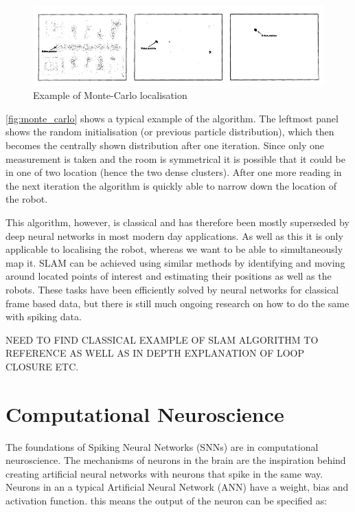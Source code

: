 \begin{figure}[htb]
      \centering
      \includegraphics[width=\textwidth]{background/images/monte_carlo.png}
      \caption{Example of Monte-Carlo localisation\cite{MonteCarloLocalisation}}
      \label{fig:monte_carlo}
\end{figure}

\autoref{fig:monte_carlo} shows a typical example of the algorithm. The leftmost panel shows the random initialisation (or previous particle distribution), which then becomes the centrally shown distribution after one iteration. Since only one measurement is taken and the room is symmetrical it is possible that it could be in one of two location (hence the two dense clusters). After one more reading in the next iteration the algorithm is quickly able to narrow down the location of the robot.

This algorithm, however, is classical and has therefore been mostly superseded by deep neural networks in most modern day applications. As well as this it is only applicable to localising the robot, whereas we want to be able to simultaneously map it. SLAM can be achieved using similar methods by identifying and moving around located points of interest and estimating their positions as well as the robots. These tasks have been efficiently solved by neural networks for classical frame based data, but there is still much ongoing research on how to do the same with spiking data.

\color{red} NEED TO FIND CLASSICAL EXAMPLE OF SLAM ALGORITHM TO REFERENCE AS WELL AS IN DEPTH EXPLANATION OF LOOP CLOSURE ETC. \color{black}

\section{Computational Neuroscience}

The foundations of Spiking Neural Networks (SNNs) are in computational neuroscience. The mechanisms of neurons in the brain are the inspiration behind creating artificial neural networks with neurons that spike in the same way. Neurons in an a typical Artificial Neural Network (ANN) have a weight, bias and activation function. this means the output of the neuron can be specified as:

